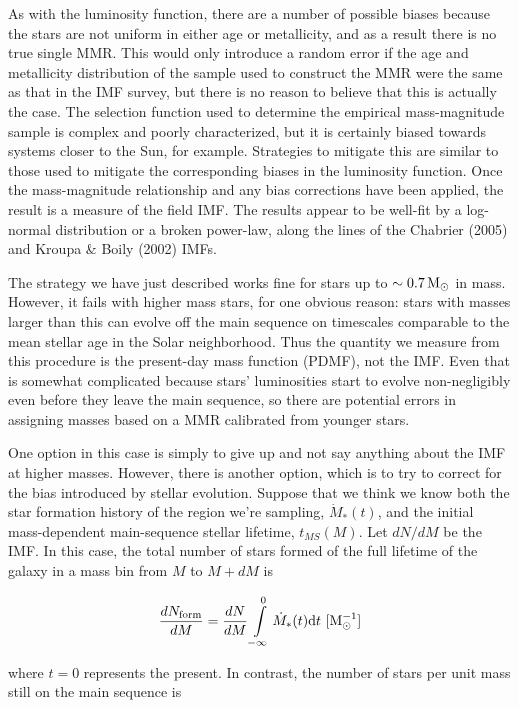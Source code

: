 \documentclass[a4paper,10pt]{article}
\begin{document}
{\noindent}As with the luminosity function, there are a number of possible biases because the stars are not uniform in either age or metallicity, and as a result there is no true single MMR. This would only introduce a random error if the age and metallicity distribution of the sample used to construct the MMR were the same as that in the IMF survey, but there is no reason to believe that this is actually
the case. The selection function used to determine the empirical mass-magnitude sample is complex and poorly characterized, but
it is certainly biased towards systems closer to the Sun, for example. Strategies to mitigate this are similar to those used to mitigate the corresponding biases in the luminosity function.
Once the mass-magnitude relationship and any bias corrections have been applied, the result is a measure of the field IMF. The results appear to be well-fit by a log-normal distribution or a broken power-law, along the lines of the Chabrier (2005) and Kroupa \& Boily (2002) IMFs.

{\noindent}The strategy we have just described works fine for stars up to $\sim0.7\,{\rm M_\odot}$ in mass. However, it fails with higher mass stars, for one obvious reason: stars with masses larger than this can evolve off the main sequence on timescales comparable to the mean stellar age in the Solar neighborhood. Thus the quantity we measure from this procedure is the present-day mass function (PDMF), not the IMF. Even that is somewhat complicated because stars' luminosities start to evolve non-negligibly even before they leave the main sequence, so there are potential errors in assigning masses based on a MMR calibrated from younger stars.

{\noindent}One option in this case is simply to give up and not say anything about the IMF at higher masses. However, there is another option, which is to try to correct for the bias introduced by stellar evolution. Suppose that we think we know both the star formation history of the region we're sampling, $\dot{M}_*(t)$, and the initial mass-dependent main-sequence stellar lifetime, $t_{MS}(M)$. Let $dN/dM$ be the IMF. In this case, the total number of stars formed of the full lifetime of the galaxy in a mass bin from $M$ to $M+dM$ is

\begin{align*}
    \frac{dN_\mathrm{form}}{dM} = \frac{dN}{dM} \int\limits_{-\infty}^0 \dot{M}_*(t){\rm d}t ~ [{\rm M_\odot^{-1}}]
\end{align*}

{\noindent}where $t=0$ represents the present. In contrast, the number of stars per unit mass still on the main sequence is
\end{document}

